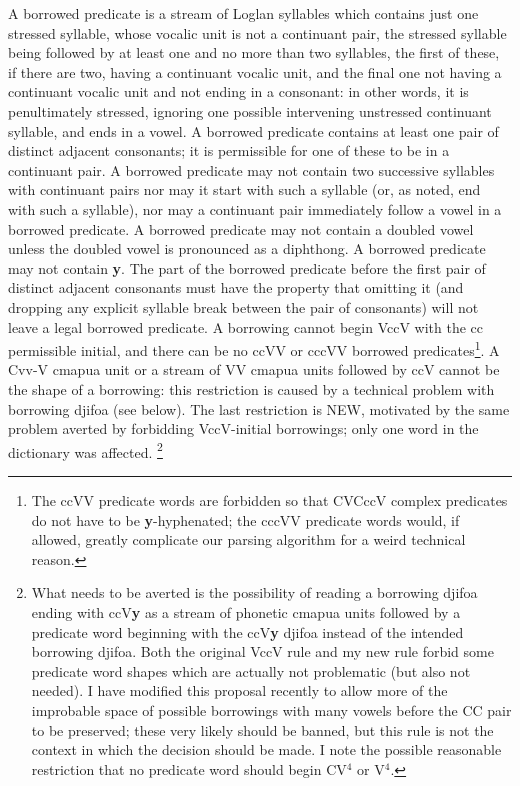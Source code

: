 \documentclass[12pt]{book}
\begin{document}
A borrowed predicate is a stream of Loglan syllables which contains just one stressed syllable, whose vocalic unit is not a continuant pair,
the stressed syllable being followed by at least one and no more than two syllables, the first of these, if there are two, having a continuant vocalic unit, and the final one not having a continuant vocalic unit and not ending in a consonant:  in other words, it is penultimately stressed, ignoring one possible intervening unstressed continuant syllable, and ends in a vowel.  A borrowed predicate contains at least one pair of distinct adjacent consonants;  it is permissible for one of these to be in a continuant pair.  A borrowed predicate may not contain two successive syllables with continuant pairs nor may it start with such a syllable (or, as noted, end with such a syllable), nor may a continuant pair immediately follow a vowel in a borrowed predicate.  A borrowed predicate may not contain a doubled vowel unless the doubled vowel is pronounced as a diphthong.   A borrowed predicate may not contain {\bf y}.  The part of the borrowed predicate
before the first pair of distinct adjacent consonants must have the property that omitting it (and dropping any explicit syllable break between the pair of consonants) will not leave a legal borrowed predicate.  A borrowing cannot begin VccV with the cc permissible initial, and there can be no ccVV
or cccVV borrowed predicates\footnote{The ccVV predicate words are forbidden so that CVCccV complex predicates do not have to be {\bf y}-hyphenated; the cccVV predicate words would, if allowed, greatly complicate our parsing algorithm for a weird technical reason.}.  A Cvv-V cmapua unit or a stream of VV cmapua units followed by ccV  cannot be the shape of a borrowing:  this restriction is caused by a technical problem with borrowing djifoa (see below).  The last restriction is NEW, motivated by the same problem averted by forbidding VccV-initial borrowings;  only one word in the dictionary was affected.  \footnote{What needs to be averted is the possibility of reading a borrowing djifoa ending with ccV{\bf y} as
a stream of phonetic cmapua units followed by a predicate word beginning with the ccV{\bf y} djifoa instead of the intended borrowing djifoa.  Both the original VccV rule and my new rule forbid some predicate word shapes which are actually not problematic (but also not needed).  I have modified this proposal recently to allow more of the improbable space of possible borrowings with many vowels before the CC pair to be preserved;  these very likely should be banned, but this rule is not the context in which the decision should be made.  I note the possible reasonable restriction that no predicate word should begin
CV$^{4}$ or V$^4$.}
\end{document}
